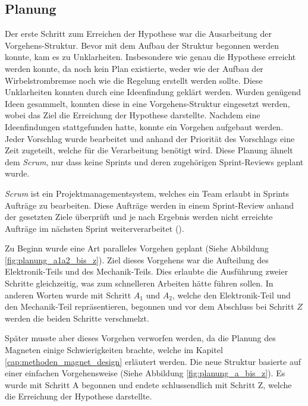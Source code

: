 \subsection{Planung}\label{cap:methoden_planung}

Der erste Schritt zum Erreichen der Hypothese war die Ausarbeitung der Vorgehens-Struktur. Bevor mit dem Aufbau der Struktur begonnen werden konnte, kam es zu Unklarheiten. Insbesondere wie genau die Hypothese erreicht werden konnte, da noch kein Plan existierte, weder wie der Aufbau der Wirbelstrombremse noch wie die Regelung erstellt werden sollte. Diese Unklarheiten konnten durch eine Ideenfindung geklärt werden. Wurden genügend Ideen gesammelt, konnten diese in eine Vorgehens-Struktur eingesetzt werden, wobei das Ziel die Erreichung der Hypothese darstellte.
\newpara
Nachdem eine Ideenfindungen stattgefunden hatte, konnte ein Vorgehen aufgebaut werden. Jeder Vorschlag wurde bearbeitet und anhand der Priorität des Vorschlags eine Zeit zugeteilt, welche für die Verarbeitung benötigt wird. Diese Planung ähnelt dem \textit{Scrum}, nur dass keine Sprints und deren zugehörigen Sprint-Reviews geplant wurde.
\newpara
\begin{tcolorbox}
  \textit{Scrum} ist ein Projektmanagementsystem, welches ein Team erlaubt in Sprints Aufträge zu bearbeiten. Diese Aufträge werden in einem Sprint-Review anhand der gesetzten Ziele überprüft und je nach Ergebnis werden nicht erreichte Aufträge im nächsten Sprint weiterverarbeitet (\cite{scrum_info}). 
\end{tcolorbox}
\newpara


Zu Beginn wurde eine Art paralleles Vorgehen geplant (Siehe Abbildung \ref{fig:planung_a1a2_bis_z}). Ziel dieses Vorgehens war die Aufteilung des Elektronik-Teils und des Mechanik-Teils. Dies erlaubte die Ausführung zweier Schritte gleichzeitig, was zum schnelleren Arbeiten hätte führen sollen. In anderen Worten wurde mit Schritt $A_1$ und $A_2$, welche den Elektronik-Teil und den Mechanik-Teil repräsentieren, begonnen und vor dem Abschluss bei Schritt $Z$ werden die beiden Schritte verschmelzt.
\newpara

Später musste aber dieses Vorgehen verworfen werden, da die Planung des Magneten einige Schwierigkeiten brachte, welche im Kapitel \ref{cap:methoden_magnet_design} erläutert werden. Die neue Struktur basierte auf einer einfachen Vorgehensweise (Siehe Abbildung \ref{fig:planung_a_bis_z}). Es wurde mit Schritt A begonnen und endete schlussendlich mit Schritt Z, welche die Erreichung der Hypothese darstellte.